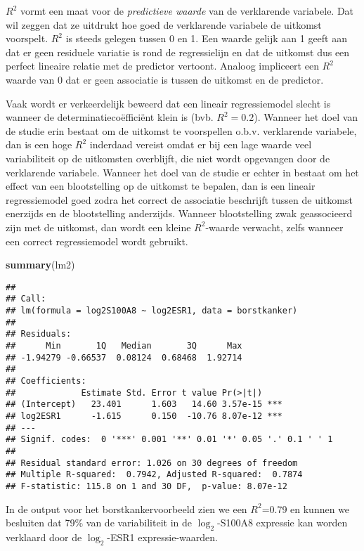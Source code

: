 \documentclass[12pt,dutch,coursenotes]{book}
\newenvironment{Shaded}{\begin{snugshade}}{\end{snugshade}}
\newcommand{\KeywordTok}[1]{\textcolor[rgb]{0.13,0.29,0.53}{\textbf{#1}}}
\newcommand{\NormalTok}[1]{#1}
\theoremstyle{definition}
\theoremstyle{definition}
\theoremstyle{definition}
\theoremstyle{remark}
\begin{document}
\(R^2\) vormt een maat voor de \emph{predictieve waarde} van de
verklarende variabele. Dat wil zeggen dat ze uitdrukt hoe goed de
verklarende variabele de uitkomst voorspelt. \(R^2\) is steeds gelegen
tussen 0 en 1. Een waarde gelijk aan 1 geeft aan dat er geen residuele
variatie is rond de regressielijn en dat de uitkomst dus een perfect
lineaire relatie met de predictor vertoont. Analoog impliceert een
\(R^2\) waarde van 0 dat er geen associatie is tussen de uitkomst en de
predictor.

Vaak wordt er verkeerdelijk beweerd dat een lineair regressiemodel
slecht is wanneer de determinatiecoëfficiënt klein is (bvb.
\(R^2=0.2\)). Wanneer het doel van de studie erin bestaat om de uitkomst
te voorspellen o.b.v. verklarende variabele, dan is een hoge \(R^2\)
inderdaad vereist omdat er bij een lage waarde veel variabiliteit op de
uitkomsten overblijft, die niet wordt opgevangen door de verklarende
variabele. Wanneer het doel van de studie er echter in bestaat om het
effect van een blootstelling op de uitkomst te bepalen, dan is een
lineair regressiemodel goed zodra het correct de associatie beschrijft
tussen de uitkomst enerzijds en de blootstelling anderzijds. Wanneer
blootstelling zwak geassocieerd zijn met de uitkomst, dan wordt een
kleine \(R^2\)-waarde verwacht, zelfs wanneer een correct regressiemodel
wordt gebruikt.

\begin{Shaded}
\begin{Highlighting}[]
\KeywordTok{summary}\NormalTok{(lm2)}
\end{Highlighting}
\end{Shaded}

\begin{verbatim}
## 
## Call:
## lm(formula = log2S100A8 ~ log2ESR1, data = borstkanker)
## 
## Residuals:
##      Min       1Q   Median       3Q      Max 
## -1.94279 -0.66537  0.08124  0.68468  1.92714 
## 
## Coefficients:
##             Estimate Std. Error t value Pr(>|t|)    
## (Intercept)   23.401      1.603   14.60 3.57e-15 ***
## log2ESR1      -1.615      0.150  -10.76 8.07e-12 ***
## ---
## Signif. codes:  0 '***' 0.001 '**' 0.01 '*' 0.05 '.' 0.1 ' ' 1
## 
## Residual standard error: 1.026 on 30 degrees of freedom
## Multiple R-squared:  0.7942, Adjusted R-squared:  0.7874 
## F-statistic: 115.8 on 1 and 30 DF,  p-value: 8.07e-12
\end{verbatim}

In de output voor het borstkankervoorbeeld zien we een \(R^2\)=0.79 en
kunnen we besluiten dat 79\% van de variabiliteit in de
\(\log_2\)-S100A8 expressie kan worden verklaard door de \(\log_2\)-ESR1
expressie-waarden.
\end{document}
